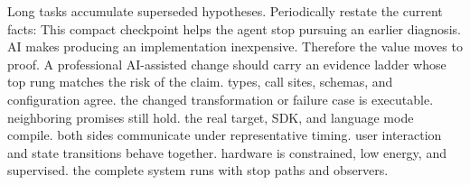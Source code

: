 \markdownRendererInterblockSeparator
{}Long tasks accumulate superseded hypotheses. Periodically restate the current\markdownRendererSoftLineBreak
{}facts:\markdownRendererInterblockSeparator
{}\markdownRendererInterblockSeparator
{}This compact checkpoint helps the agent stop pursuing an earlier diagnosis.\markdownRendererInterblockSeparator
{}\markdownRendererThematicBreak{}\markdownRendererInterblockSeparator
{}
\markdownRendererSectionEnd 
\markdownRendererSectionEnd \markdownRendererSectionBegin
{}\markdownRendererInterblockSeparator
{}AI makes producing an implementation inexpensive. Therefore the value moves to\markdownRendererSoftLineBreak
{}proof. A professional AI-assisted change should carry an evidence ladder whose\markdownRendererSoftLineBreak
{}top rung matches the risk of the claim.\markdownRendererInterblockSeparator
{}\markdownRendererSectionBegin
{}\markdownRendererInterblockSeparator
{}\markdownRendererOlBegin
{} types, call sites, schemas, and configuration agree.\markdownRendererOlItemEnd 
{} the changed transformation or failure case is executable.\markdownRendererOlItemEnd 
{} neighboring promises still hold.\markdownRendererOlItemEnd 
{} the real target, SDK, and language mode compile.\markdownRendererOlItemEnd 
{} both sides communicate under representative timing.\markdownRendererOlItemEnd 
{} user interaction and state transitions behave together.\markdownRendererOlItemEnd 
{} hardware is constrained, low energy, and supervised.\markdownRendererOlItemEnd 
{} the complete system runs with stop paths and observers.\markdownRendererOlItemEnd 
\markdownRendererOlEnd \markdownRendererInterblockSeparator
